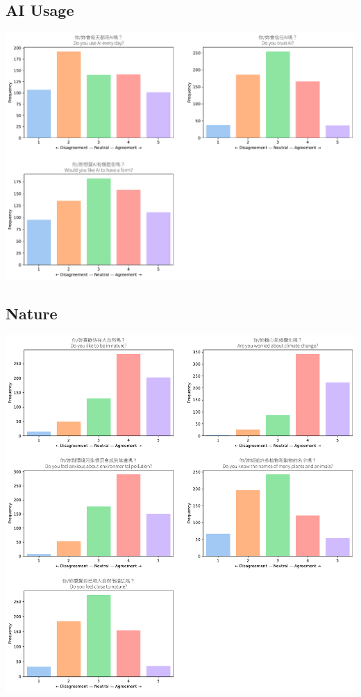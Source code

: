 \documentclass[
  letterpaper,
  DIV=11,
  numbers=noendperiod]{scrartcl}
\begin{document}
\subsection{AI Usage}\label{ai-usage}

\includegraphics{_thesis_files/figure-pdf/cell-14-output-1.pdf}

\subsection{Nature}\label{nature}

\includegraphics{_thesis_files/figure-pdf/cell-15-output-1.pdf}
\end{document}
